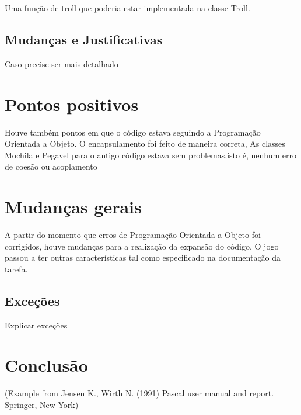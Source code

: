 \documentclass[runningheads,a4paper]{llncs}
\begin{document}
Uma função de troll que poderia estar implementada na classe Troll. 

\subsection{Mudanças e Justificativas}


Caso precise ser mais detalhado

\section{Pontos positivos}

Houve também pontos em que o código estava seguindo a Programação Orientada a Objeto. O encapsulamento foi feito de maneira correta, As classes Mochila e Pegavel para o antigo código estava sem problemas,isto é, nenhum erro de coesão ou acoplamento 

\section{Mudanças gerais}

A partir do momento que erros de Programação Orientada a Objeto foi corrigidos, houve mudanças para a realização da expansão do código. O jogo passou a ter outras características tal como especificado na documentação da tarefa.

\subsection{Exceções}

Explicar exceções

\subsection{}

\section{Conclusão}

{\small (Example from Jensen K., Wirth N. (1991) Pascal user manual and
report. Springer, New York)}


\nocite{*} 
\end{document}
